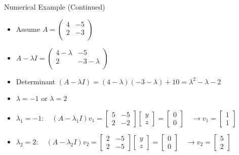 \documentclass[serif, aspectratio=169]{beamer}
\begin{document}
\begin{frame}{Numerical Example (Continued)}
    \begin{itemize}
        \item Assume $A = \begin{pmatrix}  
4 & -5  \\
2 & -3 \\
\end{pmatrix} $
    \item $A - \lambda I =  \begin{pmatrix}  
4 - \lambda & -5  \\
2 & -3 - \lambda \\
\end{pmatrix}$
    \item Determinant $(A - \lambda I) = (4 - \lambda) (-3 - \lambda) + 10 = \lambda^2 - \lambda - 2$ 
    \item $\lambda = -1$ or $\lambda = 2$
    \item $
\lambda_1 = -1 : \quad (A - \lambda_1 I) v_1 = 
\begin{bmatrix}
5 & -5 \\
2 & -2
\end{bmatrix}
\begin{bmatrix}
y \\
z
\end{bmatrix}
=
\begin{bmatrix}
0 \\
0
\end{bmatrix} \quad \rightarrow v_1 = \begin{bmatrix}
1 \\
1
\end{bmatrix}
$
    \item $
\lambda_2 = 2 : \quad (A - \lambda_2 I) v_2 = 
\begin{bmatrix}
2 & -5 \\
2 & -5
\end{bmatrix}
\begin{bmatrix}
y \\
z
\end{bmatrix}
=
\begin{bmatrix}
0 \\
0
\end{bmatrix} \quad \rightarrow v_2 = \begin{bmatrix}
5 \\
2
\end{bmatrix}
$
    \end{itemize}
\end{frame}
\end{document}
